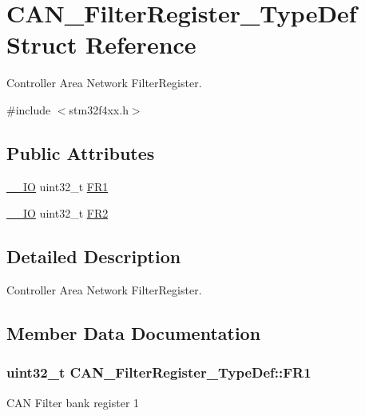 \hypertarget{struct_c_a_n___filter_register___type_def}{}\section{C\+A\+N\+\_\+\+Filter\+Register\+\_\+\+Type\+Def Struct Reference}
\label{struct_c_a_n___filter_register___type_def}


Controller Area Network Filter\+Register.  




{\ttfamily \#include $<$stm32f4xx.\+h$>$}

\subsection*{Public Attributes}
\begin{DoxyCompactItemize}
\item 
\hyperlink{core__cm4_8h_aec43007d9998a0a0e01faede4133d6be}{\+\_\+\+\_\+\+IO} uint32\+\_\+t \hyperlink{struct_c_a_n___filter_register___type_def_ac9bc1e42212239d6830582bf0c696fc5}{F\+R1}
\item 
\hyperlink{core__cm4_8h_aec43007d9998a0a0e01faede4133d6be}{\+\_\+\+\_\+\+IO} uint32\+\_\+t \hyperlink{struct_c_a_n___filter_register___type_def_a77959e28a302b05829f6a1463be7f800}{F\+R2}
\end{DoxyCompactItemize}


\subsection{Detailed Description}
Controller Area Network Filter\+Register. 

\subsection{Member Data Documentation}
\subsubsection[{\texorpdfstring{F\+R1}{FR1}}]{ uint32\+\_\+t C\+A\+N\+\_\+\+Filter\+Register\+\_\+\+Type\+Def\+::\+F\+R1}\hypertarget{struct_c_a_n___filter_register___type_def_ac9bc1e42212239d6830582bf0c696fc5}{}\label{struct_c_a_n___filter_register___type_def_ac9bc1e42212239d6830582bf0c696fc5}
C\+AN Filter bank register 1 
